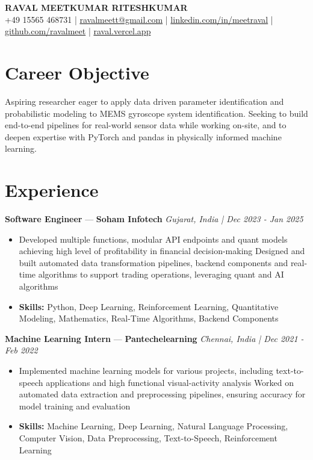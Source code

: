 \documentclass[a4paper,10pt]{article}
\begin{document}
\begin{center}
  {\Large\bfseries RAVAL MEETKUMAR RITESHKUMAR}\\[2pt]
  {\small +49 15565 468731 \;|\; \href{mailto:ravalmeett@gmail.com}{ravalmeett@gmail.com} \;|\; \href{https://www.linkedin.com/in/meetraval/}{linkedin.com/in/meetraval} \;|\; \href{https://github.com/ravalmeet}{github.com/ravalmeet} \;|\; \href{https://raval.vercel.app/}{raval.vercel.app}}
\end{center}
\vspace{-3pt}

\section*{Career Objective}
Aspiring researcher eager to apply data driven parameter identification and probabilistic modeling to MEMS gyroscope system identification. Seeking to build end-to-end pipelines for real-world sensor data while working on-site, and to deepen expertise with PyTorch and pandas in physically informed machine learning.\par

\section*{Experience}
\textbf{Software Engineer} — \textbf{Soham Infotech} \hfill \textit{Gujarat, India \;|\; Dec 2023 - Jan 2025}\par
\vspace{1pt}
\begin{itemize}
  \item Developed multiple functions, modular API endpoints and quant models achieving high level of profitability in financial decision-making Designed and built automated data transformation pipelines, backend components and real-time algorithms to support trading operations, leveraging quant and AI algorithms
  \item \textbf{Skills:} Python, Deep Learning, Reinforcement Learning, Quantitative Modeling, Mathematics, Real-Time Algorithms, Backend Components
\end{itemize}
\vspace{3pt}
\textbf{Machine Learning Intern} — \textbf{Pantechelearning} \hfill \textit{Chennai, India \;|\; Dec 2021 - Feb 2022}\par
\vspace{1pt}
\begin{itemize}
  \item Implemented machine learning models for various projects, including text-to-speech applications and high functional visual-activity analysis Worked on automated data extraction and preprocessing pipelines, ensuring accuracy for model training and evaluation
  \item \textbf{Skills:} Machine Learning, Deep Learning, Natural Language Processing, Computer Vision, Data Preprocessing, Text-to-Speech, Reinforcement Learning
\end{itemize}
\end{document}
